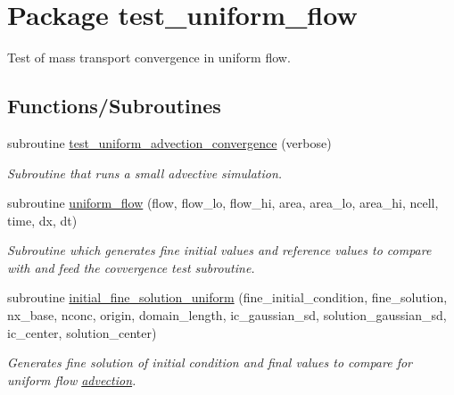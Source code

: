 \hypertarget{a00096}{
\section{Package test\_\-uniform\_\-flow}
\label{a00096}
}
Test of mass transport convergence in uniform flow.  


\subsection*{Functions/Subroutines}
\begin{CompactItemize}
\item 
\hypertarget{a00096_c2ac9e6596720006072998910c12f2ab}{
subroutine \hyperlink{a00096_c2ac9e6596720006072998910c12f2ab}{test\_\-uniform\_\-advection\_\-convergence} (verbose)}
\label{a00096_c2ac9e6596720006072998910c12f2ab}

\begin{CompactList}\small\item\em Subroutine that runs a small advective simulation. \item\end{CompactList}\item 
subroutine \hyperlink{a00096_1f5028494dfe5bf537459dff8fe74d30}{uniform\_\-flow} (flow, flow\_\-lo, flow\_\-hi, area, area\_\-lo, area\_\-hi, ncell, time, dx, dt)
\begin{CompactList}\small\item\em Subroutine which generates fine initial values and reference values to compare with and feed the covvergence test subroutine. \item\end{CompactList}\item 
subroutine \hyperlink{a00096_028516312a117d86804268a511748b43}{initial\_\-fine\_\-solution\_\-uniform} (fine\_\-initial\_\-condition, fine\_\-solution, nx\_\-base, nconc, origin, domain\_\-length, ic\_\-gaussian\_\-sd, solution\_\-gaussian\_\-sd, ic\_\-center, solution\_\-center)
\begin{CompactList}\small\item\em Generates fine solution of initial condition and final values to compare for uniform flow \hyperlink{a00052}{advection}. \item\end{CompactList}\end{CompactItemize}
